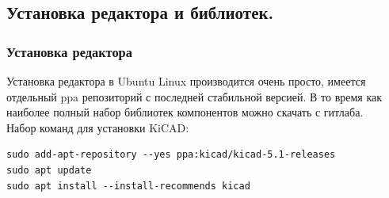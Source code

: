 \documentclass[12pt,a4paper]{article}
\begin{document}
\subsection{Установка редактора и библиотек.}
\subsubsection{Установка редактора}
    Установка редактора в Ubuntu Linux производится очень просто, имеется
    отдельный ppa репозиторий с последней стабильной версией. В то время как
    наиболее полный набор библиотек компонентов можно скачать с гитлаба.\\
    Набор команд для установки KiCAD:
\lstset{language=bash}           %
\begin{lstlisting}
sudo add-apt-repository --yes ppa:kicad/kicad-5.1-releases
sudo apt update
sudo apt install --install-recommends kicad
\end{lstlisting}
\end{document}
